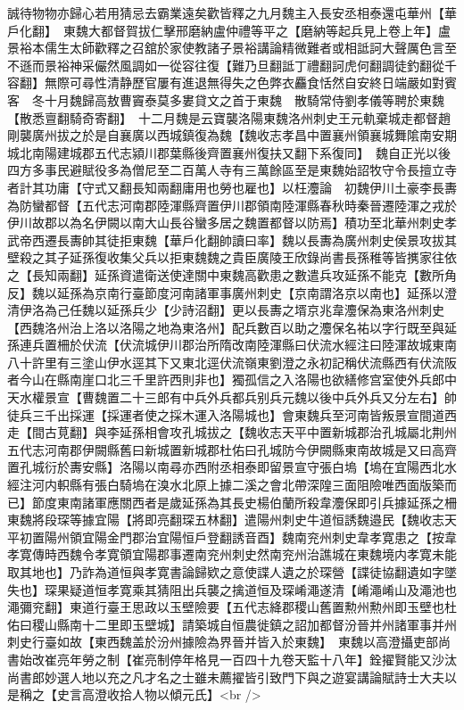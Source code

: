 誠待物物亦歸心若用猜忌去霸業遠矣歡皆釋之九月魏主入長安丞相泰還屯華州【華戶化翻】　東魏大都督賀拔仁擊邢磨納盧仲禮等平之【磨納等起兵見上卷上年】盧景裕本儒生太師歡釋之召舘於家使教諸子景裕講論精微難者或相詆訶大聲厲色言至不遜而景裕神采儼然風調如一從容往復【難乃旦翻詆丁禮翻訶虎何翻調徒釣翻從千容翻】無際可尋性清静歷官屢有進退無得失之色弊衣麤食恬然自安終日端嚴如對賓客　冬十月魏歸高敖曹竇泰莫多婁貸文之首于東魏　散騎常侍劉孝儀等聘於東魏【散悉亶翻騎奇寄翻】　十二月魏是云寶襲洛陽東魏洛州刺史王元軌棄城走都督趙剛襲廣州拔之於是自襄廣以西城鎮復為魏【魏收志孝昌中置襄州領襄城舞隂南安期城北南陽建城郡五代志潁川郡葉縣後齊置襄州復扶又翻下系復同】　魏自正光以後四方多事民避賦役多為僧尼至二百萬人寺有三萬餘區至是東魏始詔牧守令長擅立寺者計其功庸【守式又翻長知兩翻庸用也勞也雇也】以枉灋論　初魏伊川土豪李長夀為防蠻都督【五代志河南郡陸渾縣齊置伊川郡領南陸渾縣春秋時秦晉遷陸渾之戎於伊川故郡以為名伊闕以南大山長谷蠻多居之魏置都督以防焉】積功至北華州刺史孝武帝西遷長夀帥其徒拒東魏【華戶化翻帥讀曰率】魏以長夀為廣州刺史侯景攻拔其壁殺之其子延孫復收集父兵以拒東魏魏之貴臣廣陵王欣錄尚書長孫稚等皆㩗家往依之【長知兩翻】延孫資遣衛送使達關中東魏高歡患之數遣兵攻延孫不能克【數所角反】魏以延孫為京南行臺節度河南諸軍事廣州刺史【京南謂洛京以南也】延孫以澄清伊洛為己任魏以延孫兵少【少詩沼翻】更以長夀之壻京兆韋灋保為東洛州刺史【西魏洛州治上洛以洛陽之地為東洛州】配兵數百以助之灋保名祐以字行既至與延孫連兵置柵於伏流【伏流城伊川郡治所隋改南陸渾縣曰伏流水經注曰陸渾故城東南八十許里有三塗山伊水逕其下又東北逕伏流嶺東劉澄之永初記稱伏流縣西有伏流阪者今山在縣南崖口北三千里許西則非也】獨孤信之入洛陽也欲繕修宫室使外兵郎中天水權景宣【曹魏置二十三郎有中兵外兵都兵别兵元魏以後中兵外兵又分左右】帥徒兵三千出採運【採運者使之採木運入洛陽城也】會東魏兵至河南皆叛景宣間道西走【間古莧翻】與李延孫相會攻孔城拔之【魏收志天平中置新城郡治孔城屬北荆州五代志河南郡伊闕縣舊曰新城置新城郡杜佑曰孔城防今伊闕縣東南故城是又曰高齊置孔城衍於夀安縣】洛陽以南尋亦西附丞相泰即留景宣守張白塢【塢在宜陽西北水經注河内軹縣有張白騎塢在溴水北原上據二溪之會北帶深隍三面阻險唯西面版築而已】節度東南諸軍應關西者是歲延孫為其長史楊伯蘭所殺韋灋保即引兵據延孫之柵東魏將段琛等據宜陽【將即亮翻琛五林翻】遣陽州刺史牛道恒誘魏邉民【魏收志天平初置陽州領宜陽金門郡治宜陽恒戶登翻誘音酉】魏南兖州刺史韋孝寛患之【按韋孝寛傳時西魏令孝寛領宜陽郡事遷南兖州刺史然南兖州治譙城在東魏境内孝寛未能取其地也】乃詐為道恒與孝寛書論歸欵之意使諜人遺之於琛營【諜徒協翻遺如字墜失也】琛果疑道恒孝寛乘其猜阻出兵襲之擒道恒及琛崤澠遂清【崤澠崤山及澠池也澠彌兖翻】東道行臺王思政以玉壁險要【五代志絳郡稷山舊置勲州勲州即玉壁也杜佑曰稷山縣南十二里即玉壁城】請築城自恒農徙鎮之詔加都督汾晉并州諸軍事并州刺史行臺如故【東西魏盖於汾州據險為界晉并皆入於東魏】　東魏以高澄攝吏部尚書始改崔亮年勞之制【崔亮制停年格見一百四十九卷天監十八年】銓擢賢能又沙汰尚書郎妙選人地以充之凡才名之士雖未薦擢皆引致門下與之遊宴講論賦詩士大夫以是稱之【史言高澄收拾人物以傾元氏】<br />
